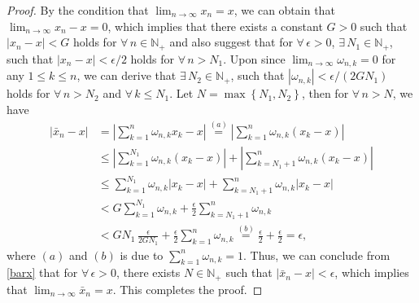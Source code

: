 \documentclass[twoside,11pt]{article}
\begin{document}
	
\begin{proof}
By the condition that $\lim_{n\to\infty}x_{n}=x$, we can obtain that $\lim_{n\to\infty}x_{n}-x=0$, which implies that there exists a constant $G>0$ such that $\lvert x_n-x\rvert< G$ holds for $\forall\,n\in \mathbb{N}_{+}$ and also suggest that for $\forall\,\epsilon>0$, $\exists\, N_1\in \mathbb{N}_{+}$, such that $\lvert x_n-x\rvert<\epsilon/2$ holds for $\forall\,n>N_1$. Upon since $\lim_{n\rightarrow\infty} \omega_{n,k}=0$ for any $1\leq k\leq n$, we can derive that $\exists\, N_2\in \mathbb{N}_{+}$, such that $|\omega_{n,k}|<\epsilon/(2GN_1)$ holds for $\forall\,n>N_2$ and $\forall\,k\le N_1$. Let $N=\max\left\lbrace N_1,N_2\right\rbrace $, then for $\forall\,n>N$, we have
\begin{equation}
\begin{aligned}\label{barx}
	\lvert \bar{x}_n-x\rvert 
	&=\left\lvert \sum_{k=1}^{n}\omega_{n,k}x_k
	-x\right\rvert 
	\overset{(a)}{=}
	\left\lvert \sum_{k=1}^{n}\omega_{n,k}
	(x_k-x)\right\rvert
	\\
	&\le
	\left\lvert 
	\sum_{k=1}^{N_1}\omega_{n,k}(x_k-x)
	\right\rvert
	+\left\lvert \sum_{k=N_{1}+1}^{n}\omega_{n,k}(x_k-x)
	\right\rvert
	\\
	&\le \sum_{k=1}^{N_1}\omega_{n,k}
	\lvert x_k-x\rvert
	+ \sum_{k=N_{1}+1}^{n}\omega_{n,k}
	\lvert x_k-x\rvert
	\\
	&<G\sum_{k=1}^{N_1}\omega_{n,k}
	+\frac{\epsilon}{2}\sum_{k=N_{1}+1}^{n}\omega_{n,k}
	\\
	&< GN_1
	\,\frac{\epsilon}{2GN_1}
	+\frac{\epsilon}{2}\sum_{k=1}^{n}\omega_{n,k}
	\overset{(b)}{=}\frac{\epsilon}{2}+\frac{\epsilon}{2}=\epsilon,
\end{aligned}
\end{equation}
where $(a)$ and $(b)$ is due to $\sum_{k=1}^{n}\omega_{n,k}=1$. Thus, we can conclude from \eqref{barx} that for $\forall\,\epsilon>0$, there exists $N\in\mathbb{N}_{+}$ such that $\lvert \bar{x}_{n}-x\rvert<\epsilon$, which implies that $\lim_{n\to\infty}\bar{x}_{n}=x$. This completes the proof.
\end{proof}
\end{document}
